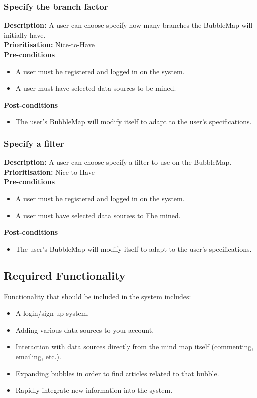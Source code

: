 \documentclass[hidelinks,english]{article}
\begin{document}
    		\subsubsection{Specify the branch factor}
				\textbf{Description:}  A user can choose specify how many branches the BubbleMap will initially have.\\
			    \textbf{Prioritisation:} Nice-to-Have\\
      			\textbf{Pre-conditions}
			    \begin{itemize}
			        \item A user must be registered and logged in on the system.
			        \item A user must have selected data sources to be mined.
			    \end{itemize}
    			\textbf{Post-conditions}
			    \begin{itemize}
			    	\item The user's BubbleMap will modify itself to adapt to the user's specifications.
    			\end{itemize}
    		\subsubsection{Specify a filter}
				\textbf{Description:}  A user can choose specify a filter to use on the BubbleMap.\\
			    \textbf{Prioritisation:} Nice-to-Have\\
    			\textbf{Pre-conditions}
			    \begin{itemize}
			        \item A user must be registered and logged in on the system.
			        \item A user must have selected data sources to Fbe mined.
			    \end{itemize}
    			\textbf{Post-conditions}
     			\begin{itemize}
        			\item The user's BubbleMap will modify itself to adapt to the user's specifications.
    			\end{itemize}
		\subsection{Required Functionality}
			Functionality that should be included in the system includes:
			\begin{itemize}
			\item A login/sign up system. 
			\item Adding various data sources to your account.
			\item Interaction with data sources directly from the mind map itself (commenting, emailing, etc.).
			\item Expanding bubbles in order to find articles related to that bubble.
			\item Rapidly integrate new information into the system.
			\end{itemize}
			
\end{document}

